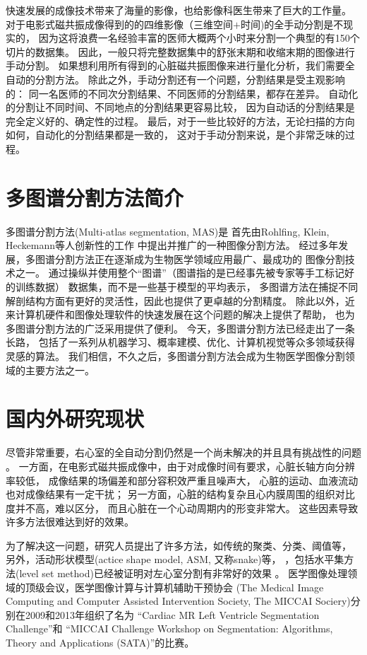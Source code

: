 快速发展的成像技术带来了海量的影像，也给影像科医生带来了巨大的工作量。
对于电影式磁共振成像得到的的四维影像（三维空间$+$时间)的全手动分割是不现实的，
因为这将浪费一名经验丰富的医师大概两个小时来分割一个典型的有150个切片的数据集。
因此，一般只将完整数据集中的舒张末期和收缩末期的图像进行手动分割。
如果想利用所有得到的心脏磁共振图像来进行量化分析，我们需要全自动的分割方法。
除此之外，手动分割还有一个问题，分割结果是受主观影响的：
同一名医师的不同次分割结果、不同医师的分割结果，都存在差异。
自动化的分割让不同时间、不同地点的分割结果更容易比较，
因为自动话的分割结果是完全定义好的、确定性的过程。
最后，对于一些比较好的方法，无论扫描的方向如何，自动化的分割结果都是一致的，
这对于手动分割来说，是个非常乏味的过程。


\section{多图谱分割方法简介}
多图谱分割方法(Multi-atlas segmentation, MAS)是
首先由Rohlfing, Klein, Heckemann等人创新性的工作
中提出并推广的一种图像分割方法。
经过多年发展，多图谱分割方法正在逐渐成为生物医学领域应用最广、最成功的
图像分割技术之一。
通过操纵并使用整个``图谱''（图谱指的是已经事先被专家等手工标记好的训练数据）
数据集，而不是一些基于模型的平均表示，
多图谱方法在捕捉不同解剖结构方面有更好的灵活性，因此也提供了更卓越的分割精度。
除此以外，近来计算机硬件和图像处理软件的快速发展在这个问题的解决上提供了帮助，
也为多图谱分割方法的广泛采用提供了便利。
今天，多图谱分割方法已经走出了一条长路，
包括了一系列从机器学习、概率建模、优化、计算机视觉等众多领域获得灵感的算法。
我们相信，不久之后，多图谱分割方法会成为生物医学图像分割领域的主要方法之一。


\section{国内外研究现状}

尽管非常重要，右心室的全自动分割仍然是一个尚未解决的并且具有挑战性的问题
。
一方面，在电影式磁共振成像中，由于对成像时间有要求，心脏长轴方向分辨率较低，
成像结果的场偏差和部分容积效严重且噪声大，
心脏的运动、血液流动也对成像结果有一定干扰；
另一方面，心脏的结构复杂且心内膜周围的组织对比度并不高，难以区分，
而且心脏在一个心动周期内的形变非常大。
这些因素导致许多方法很难达到好的效果。

为了解决这一问题，研究人员提出了许多方法，如传统的聚类、分类、阈值等，
另外，活动形状模型(actice shape model, ASM, 又称snake)等，
，包括水平集方法(level set method)已经被证明对左心室分割有非常好的效果
。
医学图像处理领域的顶级会议，医学图像计算与计算机辅助干预协会
(The Medical Image Computing and Computer Assisted Intervention Society,
The MICCAI Sociery)分别在2009和2013年组织了名为
``Cardiac MR Left Ventricle Segmentation Challenge''和
``MICCAI Challenge Workshop on Segmentation:
Algorithms, Theory and Applications (SATA)''的比赛。

